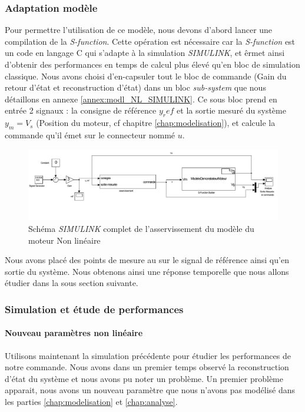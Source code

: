 		\subsubsection{Adaptation modèle}
		Pour permettre l'utilisation de ce modèle, nous devons d'abord lancer une compilation de la \emph{S-function}. Cette opération est nécessaire car la \emph{S-function} est un code en langage C qui s'adapte à la simulation \emph{SIMULINK}, et êrmet ainsi d'obtenir des performances en temps de calcul plus élevé qu'en bloc de simulation classique.
		Nous avons choisi d'en-capsuler tout le bloc de commande (Gain du retour d'état et reconstruction d'état) dans un bloc \emph{sub-system} que nous détaillons en annexe \ref{annex:modl_NL_SIMULINK}. Ce sous bloc prend en entrée 2 signaux : la consigne de référence $y_ref$ et la sortie mesuré du système $y_m = V_s$ (Position du moteur, cf chapitre \ref{chap:modelisation}), et calcule la commande qu'il émet sur le connecteur nommé $u$.\begin{figure}[ht]
		\centering
		\includegraphics[width = \textwidth]{./IV/images/NL_RE_BlocEntier.pdf}
		\caption{Schéma \emph{SIMULINK} complet de l'asservissement du modèle du moteur Non linéaire}\label{fig:SIMULINK_NL_schema}
		\end{figure}
		
		Nous avons placé des points de mesure au sur le signal de référence ainsi qu'en sortie du système. Nous obtenons ainsi une réponse temporelle que nous allons étudier dans la sous section suivante.
		\subsubsection{Simulation et étude de performances}
		\paragraph{Nouveau paramètres non linéaire}
		Utilisons maintenant la simulation précédente pour étudier les performances de notre commande. Nous avons dans un premier temps observé la reconstruction d'état du système et nous avons pu noter un problème. Un premier problème apparait, nous avons un nouveau paramètre que nous n'avons pas modélisé dans les parties \ref{chap:modelisation} et \ref{chap:analyse}. 
		
